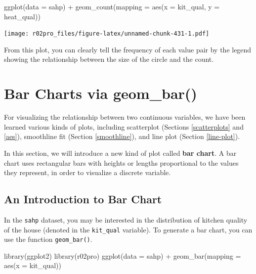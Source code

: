 \documentclass[
]{book}
\newenvironment{Shaded}{\begin{snugshade}}{\end{snugshade}}
\newcommand{\AttributeTok}[1]{\textcolor[rgb]{0.77,0.63,0.00}{#1}}
\newcommand{\FunctionTok}[1]{\textcolor[rgb]{0.00,0.00,0.00}{#1}}
\newcommand{\NormalTok}[1]{#1}
\newcommand{\SpecialCharTok}[1]{\textcolor[rgb]{0.00,0.00,0.00}{#1}}
\begin{document}
\begin{Shaded}
\begin{Highlighting}[]
\FunctionTok{ggplot}\NormalTok{(}\AttributeTok{data =}\NormalTok{ sahp) }\SpecialCharTok{+} \FunctionTok{geom\_count}\NormalTok{(}\AttributeTok{mapping =} \FunctionTok{aes}\NormalTok{(}\AttributeTok{x =}\NormalTok{ kit\_qual, }\AttributeTok{y =}\NormalTok{ heat\_qual))}
\end{Highlighting}
\end{Shaded}

\texttt{[image: r02pro\_files/figure-latex/unnamed-chunk-431-1.pdf]}

From this plot, you can clearly tell the frequency of each value pair by the legend showing the relationship between the size of the circle and the count.

\hypertarget{bar-charts}{%
\section{Bar Charts via geom\_bar()}\label{bar-charts}}

For visualizing the relationship between two continuous variables, we have been learned various kinds of plots, including scatterplot (Sections \ref{scatterplots} and \ref{aes}), smoothline fit (Section \ref{smoothline}), and line plot (Section \ref{line-plot}).

In this section, we will introduce a new kind of plot called \textbf{bar chart}. A bar chart uses rectangular bars with heights or lengths proportional to the values they represent, in order to visualize a discrete variable.

\hypertarget{an-introduction-to-bar-chart}{%
\subsection{An Introduction to Bar Chart}\label{an-introduction-to-bar-chart}}

In the \texttt{sahp} dataset, you may be interested in the distribution of kitchen quality of the house (denoted in the \texttt{kit\_qual} variable). To generate a bar chart, you can use the function \texttt{geom\_bar()}.

\begin{Shaded}
\begin{Highlighting}[]
\FunctionTok{library}\NormalTok{(ggplot2)}
\FunctionTok{library}\NormalTok{(r02pro)}
\FunctionTok{ggplot}\NormalTok{(}\AttributeTok{data =}\NormalTok{ sahp) }\SpecialCharTok{+} \FunctionTok{geom\_bar}\NormalTok{(}\AttributeTok{mapping =} \FunctionTok{aes}\NormalTok{(}\AttributeTok{x =}\NormalTok{ kit\_qual))}
\end{Highlighting}
\end{Shaded}
\end{document}
